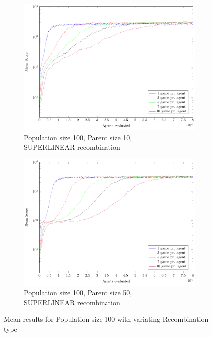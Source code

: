 \begin{figure}
\begin{subfigure}[b]{0.49\textwidth}
    \end{subfigure}
    \begin{subfigure}[b]{0.49\textwidth}
    	\centering
    	\caption{Population size 100, Parent size 10,\\SUPERLINEAR recombination}
        \includegraphics[width=\textwidth]{data/cma_population_offspring/100x_split/superlinear_l100_o10/mean/PlotFile.pdf}
    \end{subfigure}
    \begin{subfigure}[b]{0.49\textwidth}
    	\centering
    	\caption{Population size 100, Parent size 50,\\SUPERLINEAR recombination}
        \includegraphics[width=\textwidth]{data/cma_population_offspring/100x_split/superlinear_l100_o50/mean/PlotFile.pdf}
    \end{subfigure}
    
    \caption{Mean results for Population size 100 with variating Recombination type}
\end{figure}

